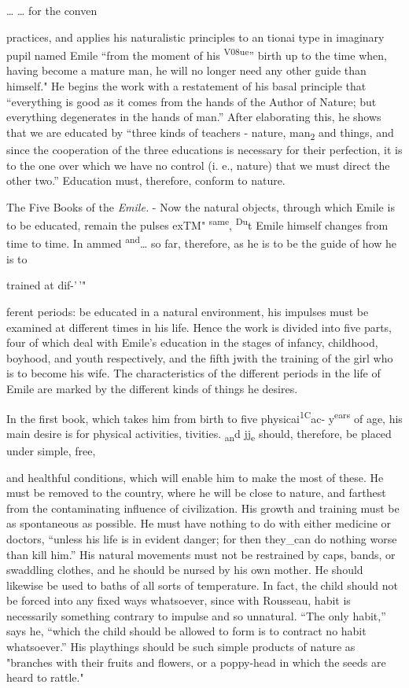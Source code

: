 \documentclass[
]{book}
\begin{document}
\ldots{} \ldots{} for the conven

practices, and applies his naturalistic principles to an tionai type in imaginary pupil named Emile ``from the moment of his \textsuperscript{V08ue}'' birth up to the time when, having become a mature man, he will no longer need any other guide than himself." He begins the work with a restatement of his basal principle that ``everything is good as it comes from the hands of the Author of Nature; but everything degenerates in the hands of man.'' After elaborating this, he shows that we are educated by ``three kinds of teachers - nature, man\textsubscript{2} and things, and since the cooperation of the three educations is necessary for their perfection, it is to the one over which we have no control (i. e., nature) that we must direct the other two.'' Education must, therefore, conform to nature.

The Five Books of the \emph{Emile.} - Now the natural objects, through which Emile is to be educated, remain the\protect\hypertarget{ch19.xmlux5cux23para.269.1.0.box.70.233.1261.94.q.50}{}{ pulses exTM" \textsuperscript{same}, \textsuperscript{Du}t Emile himself changes from time to time. In ammed \textsuperscript{and}\ldots{} so far, therefore, as he is to be the guide of how he is to}

trained at dif-'\,'"

ferent periods: be educated in a natural environment, his impulses must be examined at different times in his life. Hence the work is divided into five parts, four of which deal with Emile's education in the stages of infancy, childhood, boyhood, and youth respectively, and the fifth jwith the training of the girl who is to become his wife. The characteristics of the different periods in the life of Emile are marked by the different kinds of things he desires.

In the first book, which takes him from birth to five physicai\textsuperscript{1C}ac- y\textsuperscript{ears} of age, his main desire is for physical activities, tivities. \textsubscript{an}d jj\textsubscript{e} should, therefore, be placed under simple, free,

and healthful conditions, which will enable him to make the most of these. He must be removed to the country, where he will be close to nature, and farthest from the contaminating influence of civilization. His growth and training must be as spontaneous as possible. He must have nothing to do with either medicine or doctors, ``unless his life is in evident danger; for then they\_can do nothing worse than kill him.'' His natural movements must not be restrained by caps, bands, or swaddling clothes, and he should be nursed by his own mother. He should likewise be used to baths of all sorts of temperature. In fact, the child should not be forced into any fixed ways whatsoever, since with Rousseau, habit is necessarily something contrary to impulse and so unnatural. ``The only habit,'' says he, ``which the child should be allowed to form is to contract no habit whatsoever.'' His playthings should be such simple products of nature as "branches with their fruits and flowers, or a\protect\hypertarget{ch19.xmlux5cux23para.270.1.0.box.138.224.1053.42.q.70}{}{ poppy-head in which the seeds are heard to rattle."}
\end{document}
